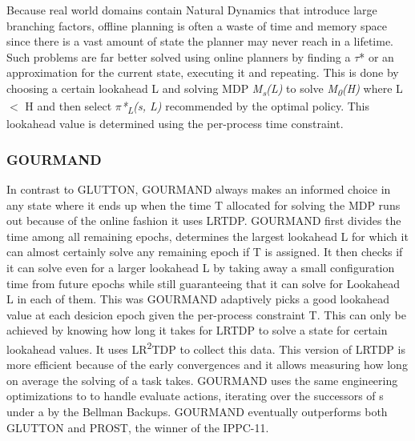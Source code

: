 \documentclass[runningheads,a4paper]{llncs}
\begin{document}
Because real world domains contain Natural Dynamics that introduce large branching factors, offline planning is often a waste of time and memory space since there is a vast amount of state the planner may never reach in a lifetime. Such problems are far better solved using online planners by finding a $\tau$* or an approximation for the current state, executing it and repeating. This is done by choosing a certain lookahead  L and solving MDP \emph{M\textsubscript{s}(L)} to solve \emph{M\textsubscript{0}(H)} where L $<$ H and then select \emph{$\pi$*\textsubscript{L}(s, L)} recommended by the optimal policy. This lookahead value is determined using the per-process time constraint.

\subsubsection{GOURMAND}
In contrast to GLUTTON, GOURMAND always makes an informed choice in any state where it ends up when the time T allocated for solving the MDP runs out because of the online fashion it uses LRTDP. GOURMAND first divides the time among all remaining epochs, determines the largest lookahead L for which it can almost certainly solve any remaining epoch if T is assigned.  It then checks if it can solve even for a larger lookahead L by taking away a small configuration time from future epochs  while still guaranteeing that it can solve for Lookahead L in each of them. This was GOURMAND adaptively picks a good lookahead value at each desicion epoch given the per-process constraint T. This can only be achieved by knowing how long it takes for LRTDP to solve a state for certain lookahead values. It uses LR\textsuperscript{2}TDP to collect this data. This version of LRTDP is more efficient because of the early convergences and it allows measuring how long on average the solving of a task takes. GOURMAND uses the same engineering optimizations to to handle evaluate actions, iterating over the successors of s under a by the Bellman Backups. GOURMAND eventually outperforms both GLUTTON and PROST, the winner of the IPPC-11\cite{keller2012prost}.


\end{document}
